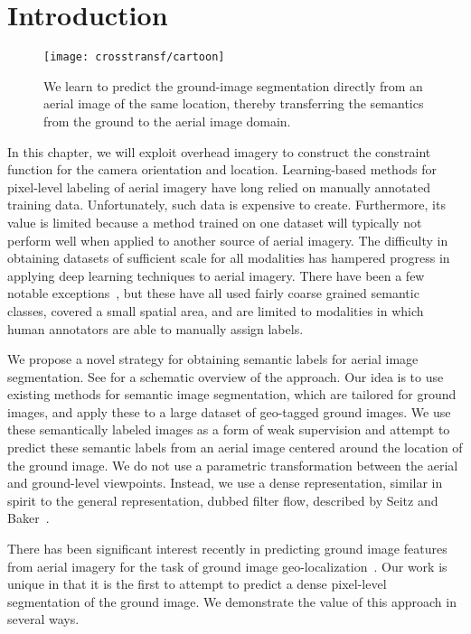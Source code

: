 \section{Introduction}

\begin{figure}[t]
	\centering
	\texttt{[image: crosstransf/cartoon]}
  \caption{We learn to predict the ground-image
    segmentation directly from an aerial image of the same location,
  thereby transferring the semantics from the ground to the aerial
image domain.}
	\label{fig:overview}
\end{figure}

In this chapter, we will exploit overhead imagery to construct
the constraint function for the camera orientation and location.
%
Learning-based methods for pixel-level labeling of aerial imagery
have long relied on manually annotated training data. Unfortunately,
such data is expensive to create. Furthermore, its value is limited
because a method trained on one dataset will typically not perform
well when applied to another source of aerial imagery.  The
difficulty in obtaining datasets of sufficient scale for all
modalities has hampered progress in applying deep learning techniques
to aerial imagery.  There have been a few notable
exceptions~\cite{mnih2010learning,paisitkriangkrai2015effective}, but
these have all used fairly coarse grained semantic classes, covered a
small spatial area, and are limited to modalities in which human
annotators are able to manually assign labels.

We propose a novel strategy for obtaining semantic labels for
aerial image segmentation.  See  for a schematic
overview of the approach.  Our idea is to use existing methods for
semantic image segmentation, which are tailored for ground
images, and apply these to a large dataset of geo-tagged ground
images.  We use these semantically labeled images as a form of weak
supervision and attempt to predict these semantic labels from an
aerial image centered around the location of the ground
image.  We do not use a parametric transformation between the
aerial and ground-level viewpoints.  Instead, we use a dense
representation, similar in spirit to the general representation,
dubbed filter flow, described by Seitz and Baker~\cite{filterflow}.  

There has been significant interest recently in predicting
ground image features from aerial imagery for the task of
ground image geo-localization~\cite{workman2015wide}. Our work is
unique in that it is the first to attempt to predict a dense
pixel-level segmentation of the ground image. We demonstrate the
value of this approach in several ways. 

